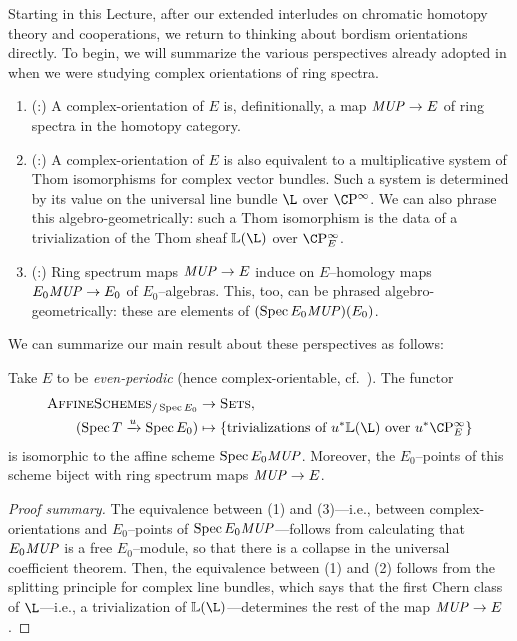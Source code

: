 Starting in this Lecture, after our extended interludes on chromatic homotopy theory and cooperations, we return to thinking about bordism orientations directly.
To begin, we will summarize the various perspectives already adopted in  when we were studying complex orientations of ring spectra.
\begin{enumerate}
\item (:) A complex-orientation of \(E\) is, definitionally, a map \(\mathit{MUP} \to E\) of ring spectra in the homotopy category.
\item (:) A complex-orientation of \(E\) is also equivalent to a multiplicative system of Thom isomorphisms for complex vector bundles.
Such a system is determined by its value on the universal line bundle \(\L\) over \(\CP^\infty\).
We can also phrase this algebro-geometrically: such a Thom isomorphism is the data of a trivialization of the Thom sheaf \(\ThomSheaf{\L}\) over \(\CP^\infty_E\).
\item (:) Ring spectrum maps \(\mathit{MUP} \to E\) induce on \(E\)--homology maps \(E_0 \mathit{MUP} \to E_0\) of \(E_0\)--algebras.
This, too, can be phrased algebro-geometrically: these are elements of \((\operatorname{Spec} E_0 \mathit{MUP})(E_0)\).
\end{enumerate}
We can summarize our main result about these perspectives as follows:
\begin{theorem}\label{BUZTriumvirate}
Take \(E\) to be \emph{even-periodic} (hence complex-orientable, cf.\ ).
The functor
\begin{align*}
\CatOf{AffineSchemes}_{/\Spec E_0} & \to \CatOf{Sets}, \\
(\Spec T \xrightarrow{u} \Spec E_0) & \mapsto \left\{ \text{trivializations of \(u^* \ThomSheaf{\L}\) over \(u^* \CP^\infty_E\)} \right\}
\end{align*}
is isomorphic to the affine scheme \(\operatorname{Spec} E_0 \mathit{MUP}\).
Moreover, the \(E_0\)--points of this scheme biject with ring spectrum maps \(\mathit{MUP} \to E\).
\end{theorem}
\begin{proof}[Proof summary]
The equivalence between (1) and (3)---i.e., between complex-orientations and \(E_0\)--points of \(\operatorname{Spec} E_0 \mathit{MUP}\)---follows from calculating that \(E_0 \mathit{MUP}\) is a free \(E_0\)--module, so that there is a collapse in the universal coefficient theorem.
Then, the equivalence between (1) and (2) follows from the splitting principle for complex line bundles, which says that the first Chern class of \(\L\)---i.e., a trivialization of \(\ThomSheaf{\L}\)---determines the rest of the map \(\mathit{MUP} \to E\).
\end{proof}

